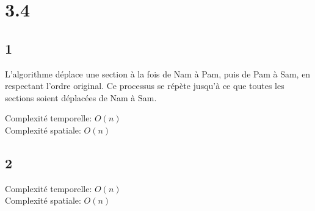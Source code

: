 \documentclass[12pt]{article}
\begin{document}
\section*{3.4}
\subsection*{1}
L'algorithme déplace une section à la fois de Nam à Pam, puis de Pam à Sam,
en respectant l'ordre original. Ce processus se répète jusqu'à ce que toutes
les sections soient déplacées de Nam à Sam.

Complexité temporelle: \(O(n)\)\\
Complexité spatiale: \(O(n)\)

\subsection*{2}
Complexité temporelle: \(O(n)\)\\
Complexité spatiale: \(O(n)\)
\end{document}
